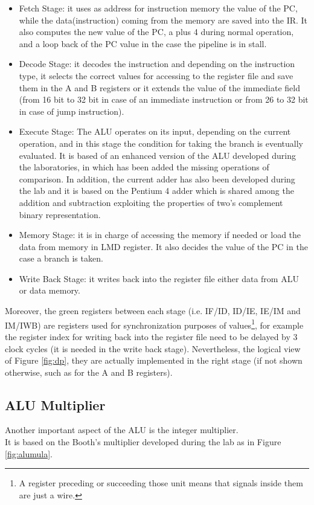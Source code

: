 \begin{itemize}
\item Fetch Stage: it uses as address for instruction memory the value of the PC, while the data(instruction) coming from the memory are saved into the IR. It also computes the new value of the PC, a plus 4 during normal operation, and a loop back of the PC value in the case the pipeline is in stall.
\item Decode Stage: it decodes the instruction and depending on the instruction type, it selects the correct values for accessing to the register file and save them in the A and B registers or it extends the value of the immediate field (from 16 bit to 32 bit in case of an immediate instruction or from 26 to 32 bit in case of jump instruction).
\item Execute Stage: The ALU operates on its input, depending on the current operation, and in this stage the condition for taking the branch is eventually evaluated. It is based of an enhanced version of the ALU developed during the laboratories, in which has been added the missing operations of comparison. In addition, the current adder has also been developed during the lab and it is based on the Pentium 4 adder which is shared among the addition and subtraction exploiting the properties of two's complement binary representation.
\item Memory Stage: it is in charge of accessing the memory if needed or load the data from memory in LMD register. It also decides the value of the PC in the case a branch is taken.
\item Write Back Stage: it writes back into the register file either data from ALU or data memory.
\end{itemize}

Moreover, the green registers between each stage (i.e. IF/ID, ID/IE, IE/IM and IM/IWB) are registers used for synchronization purposes of values\footnote{A register preceding or succeeding those unit means that signals inside them are just a wire.}, for example the register index for writing back into the register file need to be delayed by 3 clock cycles (it is needed in the write back stage). Nevertheless, the logical view of Figure \ref{fig:dp}, they are actually implemented in the right stage (if not shown otherwise, such as for the A and B registers).

\subsection{ALU Multiplier}
Another important aspect of the ALU is the integer multiplier.\\
It is based on the Booth's multiplier developed during the lab as in Figure \ref{fig:alumula}.

